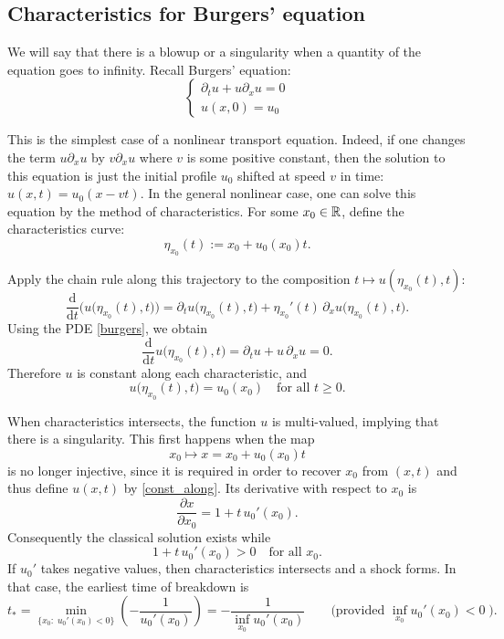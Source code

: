 \documentclass[11pt,a4paper]{article}
\begin{document}
\subsection{Characteristics for Burgers' equation}
\hspace*{2em} We will say that there is a blowup or a singularity when a quantity of the equation goes to infinity. Recall Burgers' equation:
\label{burgers}
\begin{equation}
\begin{cases} \partial_t u + u\partial_x u = 0 \\ u(x,0)=u_0 \end{cases}
\end{equation}

\noindent This is the simplest case of a nonlinear transport equation. Indeed, if one changes the term $u\partial_x u$ by $v\partial_x u$ where $v$ is some positive constant, then the solution to this equation is just the initial profile $u_0$ shifted at speed $v$ in time: $u(x,t) = u_0(x - v t)$.
In the general nonlinear case, one can solve this equation by the method of characteristics. For some $x_0\in \mathbb R$, define the characteristics curve:  \[\eta_{x_0}(t) :=x_0+ u_0(x_0)t.\]

\noindent Apply the chain rule along this trajectory to the composition $t\mapsto u(\eta_{x_0}(t),t)$:
\[
\frac{\mathrm{d}}{\mathrm{d}t} \Big(u\big(\eta_{x_0}(t),t\big)\Big)
=\partial_t u\big(\eta_{x_0}(t),t\big)+\eta_{x_0}'(t)\,\partial_x u\big(\eta_{x_0}(t),t\big).
\]
Using the PDE \eqref{burgers}, we obtain
\[
\frac{\mathrm{d}}{\mathrm{d}t}u\big(\eta_{x_0}(t),t\big)
=\partial_t u + u\,\partial_x u = 0.
\]
Therefore $u$ is constant along each characteristic, and
\begin{equation}\label{const_along}
u\big(\eta_{x_0}(t),t\big)=u_0(x_0)\quad\text{for all }t\ge0.
\end{equation}

\noindent When characteristics intersects, the function $u$ is multi-valued, implying that there is a singularity. This first happens when the map
\[x_0\mapsto x=x_0+u_0(x_0)t\]
is no longer injective, since it is required in order to recover $x_0$ from $(x,t)$ and thus define $u(x,t)$ by \eqref{const_along}. Its derivative with respect to $x_0$ is
\[
\frac{\partial x}{\partial x_0}=1+t\,u_0'(x_0).
\]
Consequently the classical solution exists while
\[1+t\,u_0'(x_0)>0\quad\text{for all }x_0.
\]
If $u_0'$ takes negative values, then characteristics intersects and a shock forms. In that case, the earliest time of breakdown is
\begin{equation}\label{break_time}
t_* = \min_{\{x_0:\;u_0'(x_0)<0\}}\left(-\frac{1}{u_0'(x_0)}\right)
= -\frac{1}{\inf_{x_0}u_0'(x_0)}\qquad\text{(provided }\inf_{x_0}u_0'(x_0)<0\;).
\end{equation}
\end{document}
